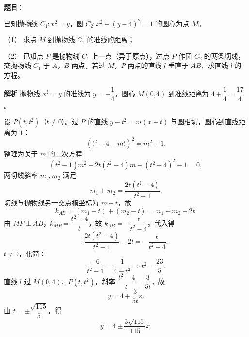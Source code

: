 \begin{answer}

\textbf{题目}：

已知抛物线 $C_1:x^2=y$，圆 $C_2:x^2+(y-4)^2=1$ 的圆心为点 $M$。

（1） 求点 $M$ 到抛物线 $C_1$ 的准线的距离；

（2） 已知点 $P$ 是抛物线 $C_1$ 上一点（异于原点），过点 $P$ 作圆 $C_2$ 的两条切线，交抛物线 $C_1$ 于 $A$，$B$ 两点，若过 $M$，$P$ 两点的直线 $l$ 垂直于 $AB$，求直线 $l$ 的方程。
\nopagebreak[4]
\begin{center}\end{center}
\nopagebreak[4]
\textbf{解析}
抛物线 $x^2=y$ 的准线为 $y=-\dfrac14$，圆心 $M(0,4)$ 到准线距离为 $4+\dfrac14=\dfrac{17}4$。

设 $P(t,t^2)$（$t\neq0$）。过 $P$ 的直线 $y-t^2=m(x-t)$ 与圆相切，圆心到直线距离为 $1$：
\nopagebreak[4]
\[(t^2-4-mt)^2=m^2+1.\]
整理为关于 $m$ 的二次方程
\nopagebreak[4]
\[(t^2-1)m^2-2t(t^2-4)m+(t^2-4)^2-1=0,\]
两切线斜率 $m_1,m_2$ 满足
\nopagebreak[4]
\[m_1+m_2=\frac{2t(t^2-4)}{t^2-1}.\]
切线与抛物线另一交点横坐标为 $m-t$，故
\nopagebreak[4]
\[k_{AB}=(m_1-t)+(m_2-t)=m_1+m_2-2t.\]
由 $MP\perp AB$，$k_{MP}=\dfrac{t^2-4}{t}$，故 $k_{AB}=-\dfrac{t}{t^2-4}$。代入得
\nopagebreak[4]
\[\frac{2t(t^2-4)}{t^2-1}-2t=-\frac{t}{t^2-4}.\]
$t\neq0$，化简：
\nopagebreak[4]
\[\frac{-6}{t^2-1}=\frac1{4-t^2}\Longrightarrow t^2=\frac{23}5.\]
直线 $l$ 过 $M(0,4)$、$P(t,t^2)$，斜率 $\dfrac{t^2-4}{t}=\dfrac{3}{5t}$，故
\nopagebreak[4]
\[y=4+\frac{3}{5t}x.\]
由 $t=\pm\dfrac{\sqrt{115}}5$，得
\nopagebreak[4]
\[y=4\pm\frac{3\sqrt{115}}{115}x.\]



\end{answer}
